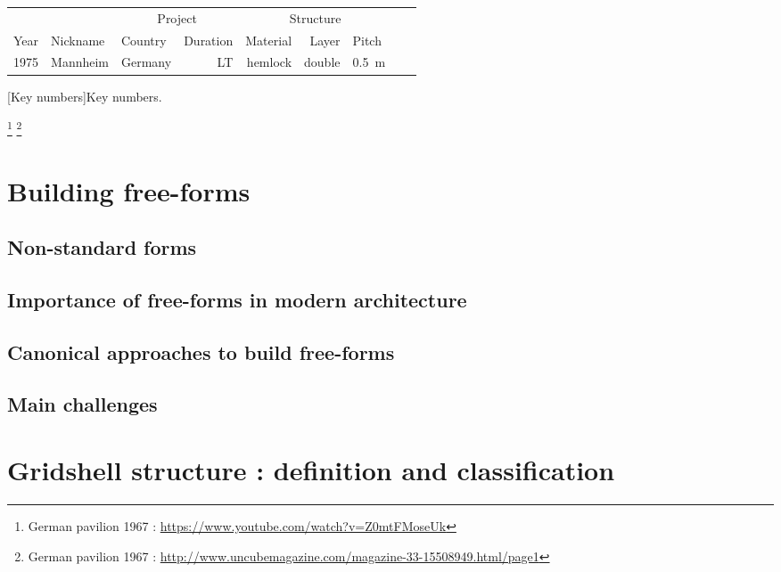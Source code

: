 \begin{landscape}%
\begin{table}[p]
\centering
{}
 	\begin{tabularx}{20cm}{@{}lll rrrXXX@{}}
	\toprule
		&			& \multicolumn{2}{c}{Project} 			& \multicolumn{3}{c}{Structure}	 	\\
	\cmidrule(l){3-4} \cmidrule(l){5-7}
 	Year & Nickname 	& Country		& Duration			& Material 	& Layer	& Pitch		\\ 
	\midrule
	1975	& Mannheim	& Germany	& LT					& hemlock	 	& double	& \SI{0.5}{m}	\\	
	\bottomrule
 	\end{tabularx}
[Key numbers]{Key numbers.}
\end{table}
\end{landscape}%




\clearpage

\footnote{German pavilion 1967 : \url{https://www.youtube.com/watch?v=Z0mtFMoseUk}}
\footnote{German pavilion 1967 : \url{http://www.uncubemagazine.com/magazine-33-15508949.html/page1}}



\section{Building free-forms}
\subsection{Non-standard forms}
\subsection{Importance of free-forms in modern architecture}
\subsection{Canonical approaches to build free-forms}
\subsection{Main challenges}

\section{Gridshell structure : definition and classification}
